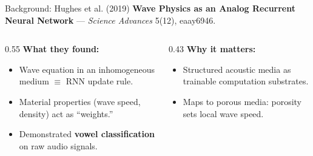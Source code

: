 \documentclass[aspectratio=169,11pt]{beamer}
\begin{document}
\begin{frame}{Background: Hughes et al. (2019)}
  \textbf{Wave Physics as an Analog Recurrent Neural Network} — \textit{Science Advances} 5(12), eaay6946.

  \vspace{0.2cm}
  \begin{columns}[T]
    \begin{column}{0.55\textwidth}
      \footnotesize
      \textbf{What they found:}
      \begin{itemize}
        \item Wave equation in an inhomogeneous medium $\equiv$ RNN update rule.
        \item Material properties (wave speed, density) act as ``weights.''
        \item Demonstrated \textbf{vowel classification} on raw audio signals.
      \end{itemize}
    \end{column}
    \begin{column}{0.43\textwidth}
      \footnotesize
      \textbf{Why it matters:}
      \begin{itemize}
        \item Structured acoustic media as trainable computation substrates.
        \item Maps to porous media: porosity sets local wave speed.
      \end{itemize}
    \end{column}
  \end{columns}
\end{frame}
\end{document}
